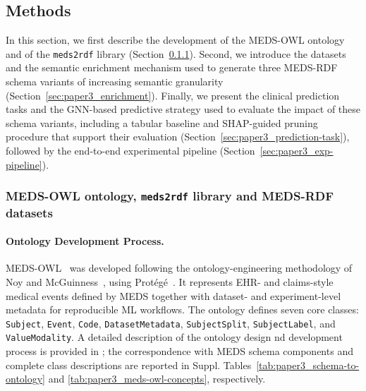 \subsection{Methods}\label{sec:paper3_methods}
In this section, we first describe the development of the MEDS-OWL ontology and of the \texttt{meds2rdf} library (Section~\ref{sec:paper3_meds-owl-design}). Second, we introduce the datasets and the semantic enrichment mechanism used to generate three MEDS-RDF schema variants of increasing semantic granularity (Section~\ref{sec:paper3_enrichment}). Finally, we present the clinical prediction tasks and the GNN-based predictive strategy used to evaluate the impact of these schema variants, including a tabular baseline and SHAP-guided pruning procedure that support their evaluation (Section~\ref{sec:paper3_prediction-task}), followed by the end-to-end experimental pipeline (Section~\ref{sec:paper3_exp-pipeline}).


\subsubsection{MEDS-OWL ontology, \texttt{meds2rdf} library and  MEDS-RDF datasets}
\label{sec:paper3_meds-owl-design}

\paragraph{Ontology Development Process.}\label{sec:paper3_ontology_development}
MEDS-OWL~\cite{marfoglia_teamhekameds-ontology_2025} was developed following the ontology-engineering methodology of Noy and McGuinness~\cite{mcguninnes}, using Protégé~\cite{musen_protege_2015}. It represents EHR- and claims-style medical events defined by MEDS together with dataset- and experiment-level metadata for reproducible ML workflows. The ontology defines seven core classes: \texttt{Subject}, \texttt{Event}, \texttt{Code}, \texttt{DatasetMetadata}, \texttt{SubjectSplit}, \texttt{SubjectLabel},
and \texttt{ValueModality}. A detailed description of the ontology design nd development process is provided in \cite{marfoglia_clinical_2026}; the correspondence with MEDS schema components and complete class descriptions are reported in Suppl. Tables~\ref{tab:paper3_schema-to-ontology} and \ref{tab:paper3_meds-owl-concepts}, respectively.


